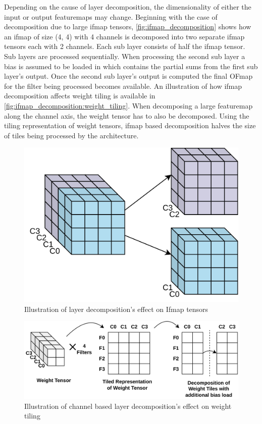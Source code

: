 Depending on the cause of layer decomposition, the dimensionality of either the
input or output featuremaps may change. Beginning with the case of decomposition due
to large ifmap tensors, \autoref{fig:ifmap_decomposition} shows how an ifmap
of size (4, 4) with 4 channels is decomposed into two separate ifmap tensors
each with 2 channels. Each sub layer consists of half the ifmap tensor. Sub
layers are processed sequentially. When
processing the second sub layer a bias is assumed to be loaded in which contains
the partial sums from the first sub layer's output. Once the second sub layer's
output is computed the final OFmap for the filter being processed becomes
available. An illustration of how ifmap decomposition affects weight tiling is
available in \autoref{fig:ifmap_decomposition:weight_tiling}. When decomposing a
large featuremap along the channel axis, the weight tensor has to also be
decomposed. Using the tiling representation of weight tensors, ifmap based
decomposition halves the size of tiles being processed by the architecture. 

\begin{figure}[ht]
    \centering
    \includegraphics[scale=0.25]{fig/ifmap_decomposition.pdf}
    \caption{Illustration of layer decomposition's effect on Ifmap tensors}
    \label{fig:ifmap_decomposition}
\end{figure}


\begin{figure}[ht]
    \centering
    \includegraphics[scale=0.4]{fig/ifmap_decomposition_tiling_repr.pdf}
    \caption{Illustration of channel based layer decomposition's effect on weight tiling}
    \label{fig:ifmap_decomposition:weight_tiling}
\end{figure}

